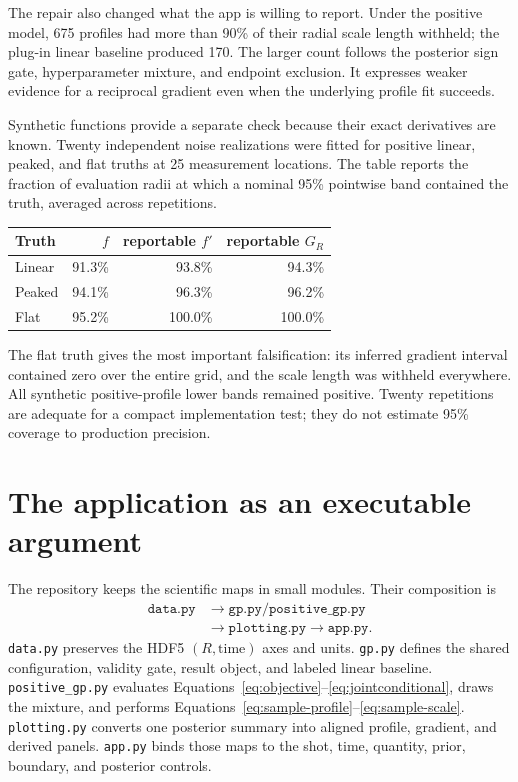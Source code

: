 \documentclass[10pt,twocolumn]{article}
\newcommand{\code}[1]{\texttt{#1}}
\begin{document}
The repair also changed what the app is willing to report.  Under the positive
model, 675 profiles had more than 90\% of their radial scale length withheld;
the plug-in linear baseline produced 170.  The larger count follows the
posterior sign gate, hyperparameter mixture, and endpoint exclusion.  It
expresses weaker evidence for a reciprocal gradient even when the underlying
profile fit succeeds.

Synthetic functions provide a separate check because their exact derivatives
are known.  Twenty independent noise realizations were fitted for positive
linear, peaked, and flat truths at 25 measurement locations.  The table reports
the fraction of evaluation radii at which a nominal 95\% pointwise band
contained the truth, averaged across repetitions.

\begin{center}
\small
\begin{tabular}{lrrr}
\toprule
Truth & $f$ & reportable $f'$ & reportable $G_R$\\
\midrule
Linear & 91.3\% & 93.8\% & 94.3\%\\
Peaked & 94.1\% & 96.3\% & 96.2\%\\
Flat & 95.2\% & 100.0\% & 100.0\%\\
\bottomrule
\end{tabular}
\end{center}

The flat truth gives the most important falsification: its inferred gradient
interval contained zero over the entire grid, and the scale length was
withheld everywhere.  All synthetic positive-profile lower bands remained
positive.  Twenty repetitions are adequate for a compact implementation test;
they do not estimate 95\% coverage to production precision.

\section{The application as an executable argument}

The repository keeps the scientific maps in small modules.  Their composition
is
\begin{equation}
\begin{aligned}
\code{data.py}&\longrightarrow
\code{gp.py}/\code{positive\_gp.py}\\
&\longrightarrow\code{plotting.py}
\longrightarrow\code{app.py}.
\end{aligned}
\end{equation}
\code{data.py} preserves the HDF5 $(R,\text{time})$ axes and units.
\code{gp.py} defines the shared configuration, validity gate, result object,
and labeled linear baseline.  \code{positive\_gp.py} evaluates
Equations~\eqref{eq:objective}--\eqref{eq:jointconditional}, draws the mixture,
and performs Equations~\eqref{eq:sample-profile}--\eqref{eq:sample-scale}.
\code{plotting.py} converts one posterior summary into aligned profile,
gradient, and derived panels.  \code{app.py} binds those maps to the shot,
time, quantity, prior, boundary, and posterior controls.
\end{document}
